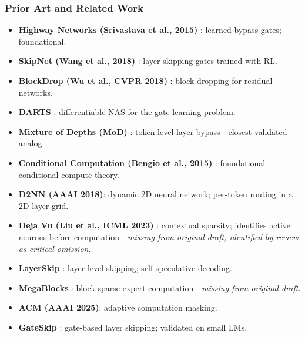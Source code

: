 \documentclass[11pt]{article}
\begin{document}
\subsubsection*{Prior Art and Related Work}
\begin{itemize}
  \item \textbf{Highway Networks (Srivastava et al., 2015)} \cite{SrivastavaEtAl2015}: learned bypass gates; foundational.

  \item \textbf{SkipNet (Wang et al., 2018)} \cite{WangEtAl2018SkipNet}: layer-skipping gates trained with RL.

  \item \textbf{BlockDrop (Wu et al., CVPR 2018)} \cite{WuEtAl2018}: block dropping for residual networks.

  \item \textbf{DARTS} \cite{LiuSiEtAl2019}: differentiable NAS for the gate-learning problem.

  \item \textbf{Mixture of Depths (MoD)} \cite{RaposoEtAl2024}: token-level layer bypass---closest validated analog.

  \item \textbf{Conditional Computation (Bengio et al., 2015)} \cite{BengioEtAl2015}: foundational conditional compute theory.

  \item \textbf{D2NN (AAAI 2018)}: dynamic 2D neural network; per-token routing in a 2D layer grid.

  \item \textbf{Deja Vu (Liu et al., ICML 2023)} \cite{LiuEtAl2023DejaVu}: contextual sparsity; identifies active neurons before computation---\emph{missing from original draft; identified by review as critical omission}.

  \item \textbf{LayerSkip} \cite{ElhoushiEtAl2024}: layer-level skipping; self-speculative decoding.

  \item \textbf{MegaBlocks} \cite{GaleLeptikhinEtAl2022}: block-sparse expert computation---\emph{missing from original draft}.

  \item \textbf{ACM (AAAI 2025)}: adaptive computation masking.

  \item \textbf{GateSkip} \cite{KimEtAl2024GateSkip}: gate-based layer skipping; validated on small LMs.
\end{itemize}
\end{document}
